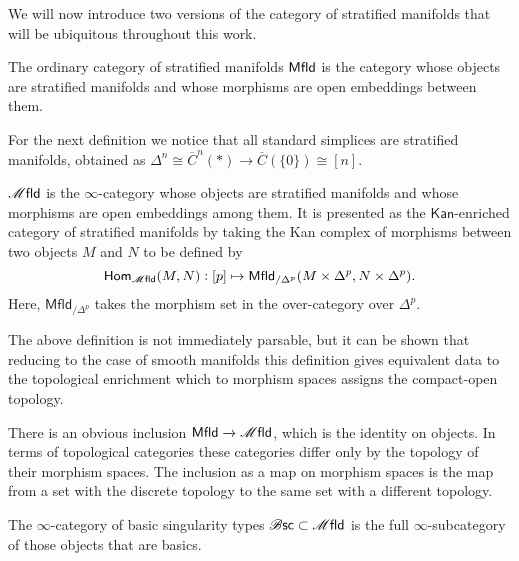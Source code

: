 \documentclass[../text]{subfiles}
\begin{document}
We will now introduce two versions of the category of stratified manifolds that will be ubiquitous throughout this work.

\begin{definition}
    The ordinary category of stratified manifolds $\mfld[r]$ is the category whose objects are stratified manifolds and whose morphisms are open embeddings between them.
\end{definition}

For the next definition we notice that all standard simplices are stratified manifolds, obtained as $\Delta^n\cong\overline{C}^n(\ast)\to\overline{C}(\{0\})\cong[n]$.

\begin{definition}
    $\mfld$ is the $\infty$-category whose objects are stratified manifolds and whose morphisms are open embeddings among them. It is presented as the $\mathsf{Kan}$-enriched category of stratified manifolds by taking the Kan complex of morphisms between two objects $M$ and $N$ to be defined by
    \begin{equation}
        \mathsf{Hom}_{\mfld} (M, N): [p] \mapsto \mathsf{Mfld}_{/\Delta^p} (M \times \Delta^p, N \times \Delta^p).
    \end{equation}
    Here, $\mathsf{Mfld}_{/\Delta^p}$ takes the morphism set in the over-category over $\Delta^p$.
\end{definition}

\begin{remark}
    The above definition is not immediately parsable, but it can be shown that reducing to the case of smooth manifolds this definition gives equivalent data to the topological enrichment which to morphism spaces assigns the compact-open topology. 
\end{remark}

\begin{remark}
    There is an obvious inclusion $\mfld[r] \xrightarrow{} \mfld$, which is the identity on objects. In terms of topological categories these categories differ only by the topology of their morphism spaces. The inclusion as a map on morphism spaces is the map from a set with the discrete topology to the same set with a different topology.
\end{remark}

\begin{definition}
    The $\infty$-category of basic singularity types $\bsc \subset \mfld$ is the full $\infty$-subcategory of those objects that are basics.
\end{definition}
\end{document}
